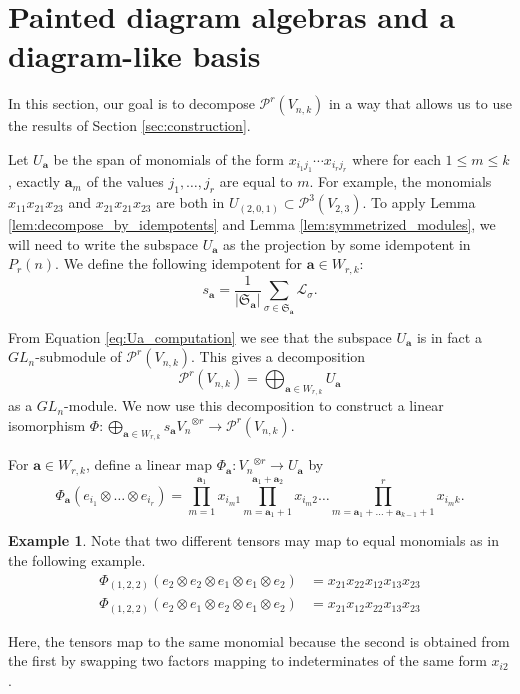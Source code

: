 \documentclass[10pt]{amsart}
\theoremstyle{definition}
\theoremstyle{definition}
\newtheorem{exam}[exam]{Example}
\theoremstyle{plain}
\theoremstyle{remark}
\theoremstyle{plain}
\theoremstyle{plain}
\newcommand{\LL}{\mathcal{L}}
\newcommand{\PP}{\mathcal{P}}
\newcommand{\SG}{\mathfrak{S}}
\newcommand{\bfa}{{\boldsymbol{a}}}
\newcommand{\abs}[1]{\left| #1\right |}
\begin{document}
\section{Painted diagram algebras and a diagram-like basis}\label{sec:diagram_like_basis}

In this section, our goal is to decompose $\PP^r(V_{n,k})$ in a way that allows us to use the results of Section \ref{sec:construction}.

Let $U_\bfa$ be the span of monomials of the form $x_{i_1j_1}\cdots x_{i_rj_r}$ where for each $1\leq m\leq k$, exactly $\bfa_m$ of the values $j_1,\dots,j_r$ are equal to $m$. For example, the monomials $x_{11}x_{21}x_{23}$ and $x_{21}x_{21}x_{23}$ are both in $U_{(2,0,1)}\subset \PP^3(V_{2,3})$.  To apply Lemma \ref{lem:decompose_by_idempotents} and Lemma \ref{lem:symmetrized_modules}, we will need to write the subspace $U_\bfa$ as the projection by some idempotent in $P_r(n)$. We define the following idempotent for $\bfa\in W_{r,k}$: \[s_\bfa=\frac{1}{\abs{\SG_\bfa}}\sum_{\sigma\in\SG_\bfa}\LL_\sigma.\]

From Equation \ref{eq:Ua_computation} we see that the subspace $U_\bfa$ is in fact a $GL_n$-submodule of $\PP^r(V_{n,k})$. This gives a decomposition \[\PP^r(V_{n,k})=\bigoplus_{\bfa\in W_{r,k}}U_\bfa\] as a $GL_n$-module. We now use this decomposition to construct a linear isomorphism $\Phi:\bigoplus_{\bfa\in W_{r,k}}s_\bfa {V_n}^{\otimes r}\to \PP^r(V_{n,k})$.

For $\bfa\in W_{r,k}$, define a linear map $\Phi_\bfa:{V_n}^{\otimes r}\to U_\bfa$ by \[\Phi_\bfa(e_{i_1}\otimes\dots\otimes e_{i_r})=\prod_{m=1}^{\bfa_1}x_{i_m1}\prod_{m=\bfa_1+1}^{\bfa_1+\bfa_2}x_{i_m2}\dots \prod_{m=\bfa_1+\dots+\bfa_{k-1}+1}^{r}x_{i_mk}.\]

\begin{exam} Note that two different tensors may map to equal monomials as in the following example.
    \begin{align*}
        \Phi_{(1,2,2)}(e_2\otimes e_2\otimes e_1\otimes e_1\otimes e_2)&=x_{21}x_{22}x_{12}x_{13}x_{23}\\
        \Phi_{(1,2,2)}(e_2\otimes e_1\otimes e_2\otimes e_1\otimes e_2)&=x_{21}x_{12}x_{22}x_{13}x_{23}
    \end{align*}

    Here, the tensors map to the same monomial because the second is obtained from the first by swapping two factors mapping to indeterminates of the same form $x_{i2}$.
\end{exam}
\end{document}
